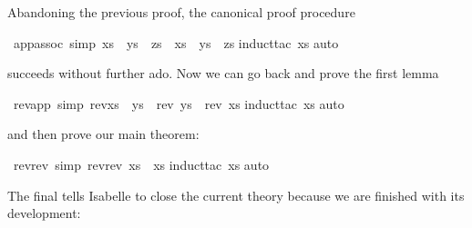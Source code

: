 \begin{isabellebody}
{}
%
\begin{isamarkuptext}%
Abandoning the previous proof, the canonical proof procedure%
\end{isamarkuptext}%
\ app{\isacharunderscore}assoc\ {\isacharbrackleft}simp{\isacharbrackright}{\isacharcolon}\ {\isachardoublequote}{\isacharparenleft}xs\ {\isacharat}\ ys{\isacharparenright}\ {\isacharat}\ zs\ {\isacharequal}\ xs\ {\isacharat}\ {\isacharparenleft}ys\ {\isacharat}\ zs{\isacharparenright}{\isachardoublequote}\isanewline
{}induct{\isacharunderscore}tac\ xs{\isacharparenright}\isanewline
{}auto{\isacharparenright}\isanewline
{}%
\begin{isamarkuptext}%
\noindent
succeeds without further ado.
Now we can go back and prove the first lemma%
\end{isamarkuptext}%
\ rev{\isacharunderscore}app\ {\isacharbrackleft}simp{\isacharbrackright}{\isacharcolon}\ {\isachardoublequote}rev{\isacharparenleft}xs\ {\isacharat}\ ys{\isacharparenright}\ {\isacharequal}\ {\isacharparenleft}rev\ ys{\isacharparenright}\ {\isacharat}\ {\isacharparenleft}rev\ xs{\isacharparenright}{\isachardoublequote}\isanewline
{}induct{\isacharunderscore}tac\ xs{\isacharparenright}\isanewline
{}auto{\isacharparenright}\isanewline
{}%
\begin{isamarkuptext}%
\noindent
and then prove our main theorem:%
\end{isamarkuptext}%
\ rev{\isacharunderscore}rev\ {\isacharbrackleft}simp{\isacharbrackright}{\isacharcolon}\ {\isachardoublequote}rev{\isacharparenleft}rev\ xs{\isacharparenright}\ {\isacharequal}\ xs{\isachardoublequote}\isanewline
{}induct{\isacharunderscore}tac\ xs{\isacharparenright}\isanewline
{}auto{\isacharparenright}\isanewline
{}%
\begin{isamarkuptext}%
\noindent
The final  tells Isabelle to close the current theory because
we are finished with its development:%
\end{isamarkuptext}%
\isanewline
\end{isabellebody}%
